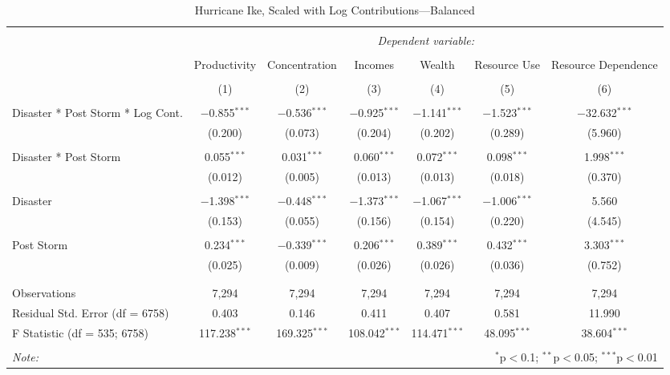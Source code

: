 
\begin{table}[!htbp] \centering 
  \caption{Hurricane Ike, Scaled with Log Contributions---Balanced} 
  \label{} 
\footnotesize 
\begin{tabular}{@{\extracolsep{5pt}}lcccccc} 
\\[-1.8ex]\hline 
\hline \\[-1.8ex] 
 & \multicolumn{6}{c}{\textit{Dependent variable:}} \\ 
\cline{2-7} 
\\[-1.8ex] & Productivity & Concentration & Incomes & Wealth & Resource Use & Resource Dependence \\ 
\\[-1.8ex] & (1) & (2) & (3) & (4) & (5) & (6)\\ 
\hline \\[-1.8ex] 
 Disaster * Post Storm * Log Cont. & $-$0.855$^{***}$ & $-$0.536$^{***}$ & $-$0.925$^{***}$ & $-$1.141$^{***}$ & $-$1.523$^{***}$ & $-$32.632$^{***}$ \\ 
  & (0.200) & (0.073) & (0.204) & (0.202) & (0.289) & (5.960) \\ 
  & & & & & & \\ 
 Disaster * Post Storm & 0.055$^{***}$ & 0.031$^{***}$ & 0.060$^{***}$ & 0.072$^{***}$ & 0.098$^{***}$ & 1.998$^{***}$ \\ 
  & (0.012) & (0.005) & (0.013) & (0.013) & (0.018) & (0.370) \\ 
  & & & & & & \\ 
 Disaster & $-$1.398$^{***}$ & $-$0.448$^{***}$ & $-$1.373$^{***}$ & $-$1.067$^{***}$ & $-$1.006$^{***}$ & 5.560 \\ 
  & (0.153) & (0.055) & (0.156) & (0.154) & (0.220) & (4.545) \\ 
  & & & & & & \\ 
 Post Storm & 0.234$^{***}$ & $-$0.339$^{***}$ & 0.206$^{***}$ & 0.389$^{***}$ & 0.432$^{***}$ & 3.303$^{***}$ \\ 
  & (0.025) & (0.009) & (0.026) & (0.026) & (0.036) & (0.752) \\ 
  & & & & & & \\ 
\hline \\[-1.8ex] 
Observations & 7,294 & 7,294 & 7,294 & 7,294 & 7,294 & 7,294 \\ 
Residual Std. Error (df = 6758) & 0.403 & 0.146 & 0.411 & 0.407 & 0.581 & 11.990 \\ 
F Statistic (df = 535; 6758) & 117.238$^{***}$ & 169.325$^{***}$ & 108.042$^{***}$ & 114.471$^{***}$ & 48.095$^{***}$ & 38.604$^{***}$ \\ 
\hline 
\hline \\[-1.8ex] 
\textit{Note:}  & \multicolumn{6}{r}{$^{*}$p$<$0.1; $^{**}$p$<$0.05; $^{***}$p$<$0.01} \\ 
\end{tabular} 
\end{table} 

